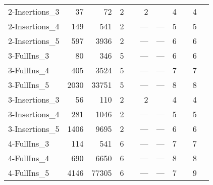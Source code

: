 \begin{table}[t]
\begin{tabular}{lrrrlrlrlrl}
  2-Insertions\_3 & 37 & 72 & 2 & \cite{Malaguti2011} & 2 & \cite{Gualandi2012} & 4 & \cite{Caramia,Gualandi2012} & 4 & \cite{Caramia,Gualandi2012} \\ 
  2-Insertions\_4 & 149 & 541 & 2 & \cite{Malaguti2011} & --- & --- & 5 & \cite{Malaguti2010} & 5 & \cite{Malaguti2010} \\ 
  2-Insertions\_5 & 597 & 3936 & 2 & \cite{Malaguti2011} & --- & --- & 6 & \cite{Malaguti2010} & 6 & \cite{Malaguti2010} \\ 
  3-FullIns\_3 & 80 & 346 & 5 & \cite{Malaguti2011} & --- & --- & 6 & \cite{Mendez-Diaz2006,Mendez-Diaz2008,Malaguti2011,Gualandi2012} & 6 & \cite{Mendez-Diaz2006,Malaguti2011,Gualandi2012,Mendez-Diaz2006,Brelaz1979,Sewell1996,Segundo2012} \\ 
  3-FullIns\_4 & 405 & 3524 & 5 & \cite{us} & --- & --- & 7 & \cite{Mendez-Diaz2006} & 7 & \cite{Mendez-Diaz2006,Malaguti2011,Gualandi2012,Mendez-Diaz2006,Brelaz1979,Sewell1996,Segundo2012} \\ 
  3-FullIns\_5 & 2030 & 33751 & 5 & \cite{us} & --- & --- & 8 & \cite{Malaguti2010} & 8 & \cite{Mendez-Diaz2006,Mendez-Diaz2006,Malaguti2010,Malaguti2011,Brelaz1979,Sewell1996,Segundo2012} \\ 
  3-Insertions\_3 & 56 & 110 & 2 & \cite{Malaguti2011} & 2 & \cite{Gualandi2012} & 4 & \cite{Mendez-Diaz2006,Mendez-Diaz2006,Caramia,Gualandi2012} & 4 & \cite{Mendez-Diaz2006,Mendez-Diaz2006,Caramia,Malaguti2011,Gualandi2012,Brelaz1979,Sewell1996,Segundo2012} \\ 
  3-Insertions\_4 & 281 & 1046 & 2 & \cite{Malaguti2011} & --- & --- & 5 & \cite{Malaguti2010} & 5 & \cite{Malaguti2010,Mendez-Diaz2006,Mendez-Diaz2006,Malaguti2011,Gualandi2012,Brelaz1979,Sewell1996,Segundo2012} \\ 
  3-Insertions\_5 & 1406 & 9695 & 2 & \cite{Malaguti2011,Held2011} & --- & --- & 6 & \cite{Malaguti2010} & 6 & \cite{Mendez-Diaz2006,Mendez-Diaz2006,Malaguti2011,Gualandi2012,Brelaz1979,Sewell1996,Segundo2012} \\ 
  4-FullIns\_3 & 114 & 541 & 6 & \cite{us} & --- & --- & 7 & \cite{Mendez-Diaz2006,Malaguti2011,Gualandi2012} & 7 & \cite{Mendez-Diaz2006,Malaguti2011,Gualandi2012,Brelaz1979,Sewell1996,Segundo2012} \\ 
  4-FullIns\_4 & 690 & 6650 & 6 & \cite{us} & --- & --- & 8 & \cite{Malaguti2010} & 8 & \cite{Mendez-Diaz2006,Mendez-Diaz2006,Malaguti2010,Malaguti2011,Gualandi2012,Brelaz1979,Sewell1996,Segundo2012} \\ 
  4-FullIns\_5 & 4146 & 77305 & 6 & \cite{us} & --- & --- & 7 & \cite{Malaguti2011} & 9 & \cite{Mendez-Diaz2006,Mendez-Diaz2006,Malaguti2011,Brelaz1979,Sewell1996,Segundo2012} \\ 

\end{tabular}
\end{table}
